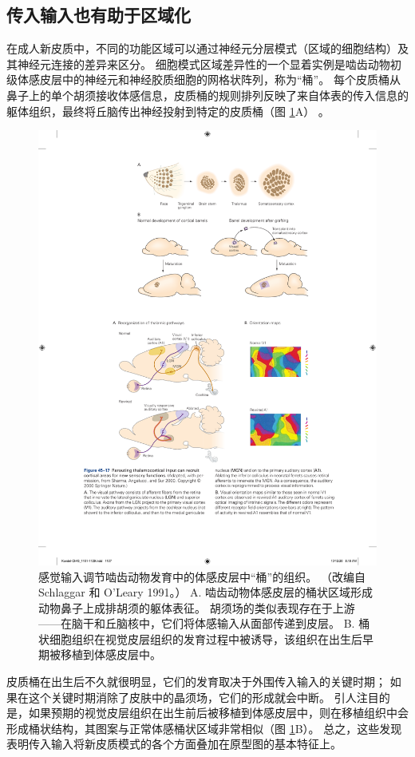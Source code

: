 \subsection{传入输入也有助于区域化}
在成人新皮质中，不同的功能区域可以通过神经元分层模式（区域的细胞结构）及其神经元连接的差异来区分。 细胞模式区域差异性的一个显着实例是啮齿动物初级体感皮层中的神经元和神经胶质细胞的网格状阵列，称为“桶”。 
每个皮质桶从鼻子上的单个胡须接收体感信息，皮质桶的规则排列反映了来自体表的传入信息的躯体组织，最终将丘脑传出神经投射到特定的皮质桶（图 \ref{fig:45_16}A） 。

\begin{figure}[htbp]
	\centering
	\includegraphics[width=0.7\linewidth]{chap45/fig_45_16}
	\caption{感觉输入调节啮齿动物发育中的体感皮层中“桶”的组织。 （改编自 Schlaggar 和 O’Leary 1991。） A. 啮齿动物体感皮层的桶状区域形成动物鼻子上成排胡须的躯体表征。 胡须场的类似表现存在于上游——在脑干和丘脑核中，它们将体感输入从面部传递到皮层。 B. 桶状细胞组织在视觉皮层组织的发育过程中被诱导，该组织在出生后早期被移植到体感皮层中。}
	\label{fig:45_16}
\end{figure}

皮质桶在出生后不久就很明显，它们的发育取决于外围传入输入的关键时期； 如果在这个关键时期消除了皮肤中的晶须场，它们的形成就会中断。 引人注目的是，如果预期的视觉皮层组织在出生前后被移植到体感皮层中，则在移植组织中会形成桶状结构，其图案与正常体感桶状区域非常相似（图 \ref{fig:45_16}B）。 总之，这些发现表明传入输入将新皮质模式的各个方面叠加在原型图的基本特征上。

